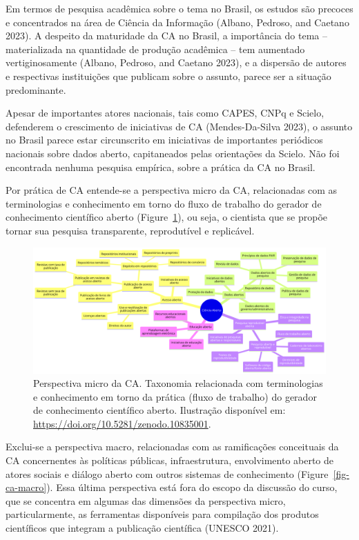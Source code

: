 \documentclass[
  a4paper,
]{article}
\begin{document}
Em termos de pesquisa acadêmica sobre o tema no Brasil, os estudos são
precoces e concentrados na área de Ciência da Informação (Albano,
Pedroso, and Caetano 2023). A despeito da maturidade da CA no Brasil, a
importância do tema -- materializada na quantidade de produção acadêmica
-- tem aumentado vertiginosamente (Albano, Pedroso, and Caetano 2023), e
a dispersão de autores e respectivas instituições que publicam sobre o
assunto, parece ser a situação predominante.

Apesar de importantes atores nacionais, tais como CAPES, CNPq e Scielo,
defenderem o crescimento de iniciativas de CA (Mendes-Da-Silva 2023), o
assunto no Brasil parece estar circunscrito em iniciativas de
importantes periódicos nacionais sobre dados aberto, capitaneados pelas
orientações da Scielo. Não foi encontrada nenhuma pesquisa empírica,
sobre a prática da CA no Brasil.

Por prática de CA entende-se a perspectiva micro da CA, relacionadas com
as terminologias e conhecimento em torno do fluxo de trabalho do gerador
de conhecimento científico aberto (Figure~\ref{fig-ca-micro}), ou seja,
o cientista que se propõe tornar sua pesquisa transparente, reprodutível
e replicável.

\begin{figure}

\includegraphics{img/ca-micro.png}

\caption{\label{fig-ca-micro}Perspectiva micro da CA. Taxonomia
relacionada com terminologias e conhecimento em torno da prática (fluxo
de trabalho) do gerador de conhecimento científico aberto. Ilustração
disponível em: \url{https://doi.org/10.5281/zenodo.10835001}.}

\end{figure}%

Exclui-se a perspectiva macro, relacionadas com as ramificações
conceituais da CA concernentes às políticas públicas, infraestrutura,
envolvimento aberto de atores sociais e diálogo aberto com outros
sistemas de conhecimento (Figure~\ref{fig-ca-macro}). Essa última
perspectiva está fora do escopo da discussão do curso, que se concentra
em algumas das dimensões da perspectiva micro, particularmente, as
ferramentas disponíveis para compilação dos produtos científicos que
integram a publicação científica (UNESCO 2021).
\end{document}
